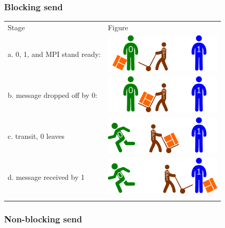 \subsubsection{Blocking send}\label{blocking-send}

\begin{longtable}[c]{@{}ll@{}}
\toprule\addlinespace
Stage & Figure
\\\addlinespace
\midrule\endhead
a. 0, 1, and MPI stand ready: &
\includegraphics{06MPI/figures/sync0.png}
\\\addlinespace
b. message dropped off by 0: & \includegraphics{06MPI/figures/sync1.png}
\\\addlinespace
c. transit, 0 leaves & \includegraphics{06MPI/figures/ssyncT.png}
\\\addlinespace
d. message received by 1 & \includegraphics{06MPI/figures/ssyncA.png}
\\\addlinespace
\bottomrule
\end{longtable}

\subsubsection{Non-blocking send}\label{non-blocking-send}

